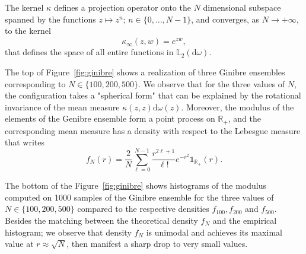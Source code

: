 \documentclass[twoside,11pt]{book}
\numberwithin{theorem}{chapter}
\numberwithin{definition}{chapter}
\numberwithin{proposition}{chapter}
\numberwithin{corollary}{chapter}
\numberwithin{example}{chapter}
\numberwithin{lemma}{chapter}
\numberwithin{assumption}{chapter}
\numberwithin{equation}{chapter}
\numberwithin{figure}{chapter}
\begin{document}



The kernel $\kappa$ defines a projection operator onto the $N$ dimensional subspace spanned by the functions $z \mapsto z^{n}$; $n \in \{0, \dots, N-1 \}$, and converges, as $N \rightarrow +\infty$, to the kernel
\begin{equation}
\kappa_{\infty}(z,w) = e^{z \overline{w}},
\end{equation} 
that defines the space
of all entire functions in $\mathbb{L}_{2}(\mathrm{d}\omega)$. 

The top of Figure~\ref{fig:ginibre} shows a  realization of three Ginibre ensembles corresponding to $N \in \{100,200,500\}$. We observe that for the three values of $N$, the configuration takes a "spherical form" that can be explained by the rotational invariance of the mean measure $\kappa(z,z) \mathrm{d}\omega(z)$. Moreover, the modulus of the elements of the Genibre ensemble form a point process on $\mathbb{R}_{+}$, and the corresponding mean measure has a density with respect to the Lebesgue measure that writes
\begin{equation}
f_{N}(r) = \frac{2}{N}\sum\limits_{\ell =0}^{N-1} \frac{r^{2\ell+1}}{\ell!}e^{-r^{2}} \mathbb{1}_{\mathbb{R}_{+}}(r).
\end{equation}

The bottom of the Figure~\ref{fig:ginibre} shows histograms of the modulus computed on 1000 samples of the Ginibre ensemble for the three values of $N \in \{100,200,500\}$  compared to the respective densities $f_{100},f_{200}$ and $f_{500}$. Besides the matching between the theoretical density $f_{N}$ and the empirical histogram; we observe that density $f_{N}$ is unimodal and achieves its maximal value at $r \approx \sqrt{N}$, then manifest a sharp drop to very small values.


\end{document}
